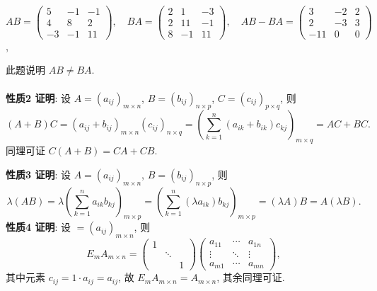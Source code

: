 	 \paragraph{} %
		 $AB = \begin{pmatrix}
				 5  & -1 & -1 \\
				 4  & 8  & 2  \\
				 -3 & -1 & 11
			 \end{pmatrix}, \quad
			 BA = \begin{pmatrix}
				 2 & 1  & -3 \\
				 2 & 11 & -1 \\
				 8 & -1 & 11
			 \end{pmatrix}, \quad
			 AB - BA = \begin{pmatrix}
				 3   & -2 & 2 \\
				 2   & -3 & 3 \\
				 -11 & 0  & 0
			 \end{pmatrix}$,

		 此题说明 $AB \neq BA$.


	 \paragraph{} %
		 \textbf{性质2 证明}: 设 $A = (a_{ij})_{m \times n}$, $B = (b_{ij})_{n \times p}$, $C = (c_{ij})_{p \times q}$, 则
		 \[
			 (A + B)C = (a_{ij} + b_{ij})_{m \times n} (c_{ij})_{n \times q} = \left( \sum_{k=1}^{n} (a_{ik} + b_{ik}) c_{kj} \right)_{m \times q} = AC + BC.
		 \]
		 同理可证 $C(A + B) = CA + CB$.

		 \textbf{性质3 证明}: 设 $A = (a_{ij})_{m \times n}$, $B = (b_{ij})_{n \times p}$, 则
		 \[
			 \lambda(AB) = \lambda \left( \sum_{k=1}^{n} a_{ik} b_{kj} \right)_{m \times p} = \left( \sum_{k=1}^{n} (\lambda a_{ik}) b_{kj} \right)_{m \times p} = (\lambda A)B = A(\lambda B).
		 \]
		 \textbf{性质4 证明}: 设 $ = (a_{ij})_{m \times n}$, 则
		 \[
			 E_m A_{m \times n} = \begin{pmatrix}
				 1 &        &   \\
				   & \ddots &   \\
				   &        & 1
			 \end{pmatrix}
			 \begin{pmatrix}
				 a_{11} & \cdots & a_{1n} \\
				 \vdots & \ddots & \vdots \\
				 a_{m1} & \cdots & a_{mn}
			 \end{pmatrix},
		 \]
		 其中元素 $c_{ij} = 1 \cdot a_{ij} = a_{ij}$, 故 $E_m A_{m \times n} = A_{m \times n}$, 其余同理可证.


